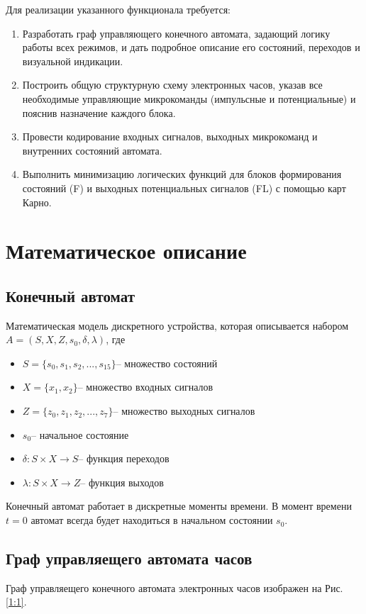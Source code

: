 \documentclass[11pt,a4paper,final]{article}
\begin{document}
	 Для реализации указанного функционала требуется:
	 \begin{enumerate}
	 	\item Разработать граф управляющего конечного автомата, задающий логику работы всех режимов, и дать подробное описание его состояний, переходов и визуальной индикации.
	 	\item Построить общую структурную схему электронных часов, указав все необходимые управляющие микрокоманды (импульсные и потенциальные) и пояснив назначение каждого блока.
	 	\item Провести кодирование входных сигналов, выходных микрокоманд и внутренних состояний автомата.
	 	\item Выполнить минимизацию логических функций для блоков формирования состояний (F) и выходных потенциальных сигналов (FL) с помощью карт Карно.
	 \end{enumerate}
	 

	
	\newpage
	\section{Математическое описание}
	\subsection{Конечный автомат}
	Математическая модель дискретного устройства, которая описывается набором $A = (S, X, Z, s_0, \delta, \lambda)$, где 
	\begin{itemize}
		\item $S = \{s_0, s_1, s_2, ... , s_{15}\} \text{-- множество состояний}$
		\item $X = \{x_1, x_2\} \text{-- множество входных сигналов}$
		\item $Z = \{z_0, z_1, z_2, ... , z_7\} \text{-- множество выходных сигналов}$
		\item $s_0 \text{-- начальное состояние} $
		\item $\delta: S \times X \rightarrow S \text{-- функция переходов}$
		\item  $\lambda: S \times X \rightarrow Z \text{-- функция выходов}$
	\end{itemize}
	
	Конечный автомат работает в дискретные моменты времени. В момент времени $t=0$ автомат всегда будет находиться в начальном состоянии $s_0$.

	
	\subsection{Граф управляещего автомата часов}
	Граф управляещего конечного автомата электронных часов изображен на Рис. \ref{1:1}.
	
\end{document}
